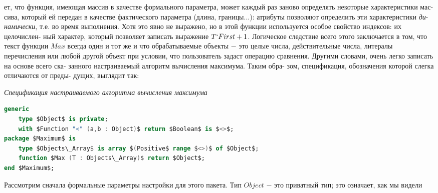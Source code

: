 \noindent
ет, что функция, имеющая массив в качестве формального параметра,\linebreak
может каждый раз заново определять некоторые характеристики мас-\linebreak
сива,  который ей  передан  в качестве фактического параметра (длина,\linebreak
границы...):  атрибуты позволяют определить эти характеристики \textit{ди}-\linebreak
\textit{намически}, т.е. во время выполнения. Хотя это явно не выражено, но в\linebreak
этой  функции  используется  особое  свойство  индексов:  их  целочислен-\linebreak
ный характер, который позволяет записать выражение $T`First+1$.\newline
\hspace*{15pt}Логическое  следствие  всего  этого  заключается  в  том,  что  текст\linebreak
функции $Max$ всегда один и тот же и что обрабатываемые объекты $-$\linebreak
это  целые  числа,  действительные  числа,  литералы  перечисления  или\linebreak
любой другой объект при условии,  что пользователь задаст операцию\linebreak
сравнения. Другими словами, очень легко записать на основе всего ска-\linebreak
занного настраиваемый алгоритм вычисления максимума. Таким обра-\linebreak
зом, спецификация, обозначения которой слегка отличаются от преды-\linebreak
дущих, выглядит так:
\begin{center}
\textit{Спецификация настраиваемого алгоритма вычисления максимума}
\end{center}
\begin{lstlisting}[mathescape=true, language=Ada]
generic
    type $Object$ is private;
    with $Function "<" (a,b : Object)$ return $Boolean$ is $<>$;
package $Maximum$ is
    type $Objects\_Array$ is array $(Positive$ range $<>)$ of $Object$;
    function $Max (T : Objects\_Array)$ return $Object$;
end $Maximum$;
\end{lstlisting}
\hspace*{15pt}Рассмотрим сначала формальные  параметры  настройки  для этого\linebreak
пакета. Тип $Object$ $-$ это приватный тип; это означает, как мы видели\linebreak
